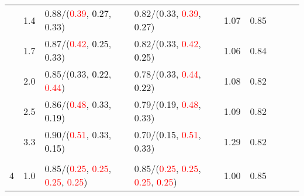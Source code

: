 \documentclass[10pt,a4paper]{report}
\begin{document}
\begin{table}[!htbp]
\begin{center}
{\begin{tabular}{ccllccccc}
				  & 1.4                               & 0.88/(\textcolor{red}{0.39}, \textcolor{black}{0.27}, 0.33)                                                                                     & 0.82/(0.33, \textcolor{red}{0.39}, \textcolor{black}{0.27})                                                                                     & 1.07             & 0.85                     \\
				  & 1.7                               & 0.87/(\textcolor{red}{0.42}, \textcolor{black}{0.25}, 0.33)                                                                                     & 0.82/(0.33, \textcolor{red}{0.42}, \textcolor{black}{0.25})                                                                                     & 1.06             & 0.84                     \\
				  & 2.0                               & 0.85/(0.33, \textcolor{black}{0.22}, \textcolor{red}{0.44})                                                                                     & 0.78/(0.33, \textcolor{red}{0.44}, \textcolor{black}{0.22})                                                                                     & 1.08             & 0.82                     \\
				  & 2.5                               & 0.86/(\textcolor{red}{0.48}, 0.33, \textcolor{black}{0.19})                                                                                     & 0.79/(\textcolor{black}{0.19}, \textcolor{red}{0.48}, 0.33)                                                                                     & 1.09             & 0.82                     \\
				  & 3.3                               & 0.90/(\textcolor{red}{0.51}, 0.33, \textcolor{black}{0.15})                                                                                     & 0.70/(\textcolor{black}{0.15}, \textcolor{red}{0.51}, 0.33)                                                                                     & 1.29             & 0.82                     \\
				  &                                   &                                                                                                                                                 &                                                                                                                                                 &                                             \\
				4 & 1.0                               & 0.85/(\textcolor{red}{0.25}, \textcolor{red}{0.25}, \textcolor{red}{0.25}, \textcolor{red}{0.25})                                               & 0.85/(\textcolor{red}{0.25}, \textcolor{red}{0.25}, \textcolor{red}{0.25}, \textcolor{red}{0.25})                                               & 1.00             & 0.85                     \\

\end{tabular}}
\end{center}
\end{table}
\end{document}
